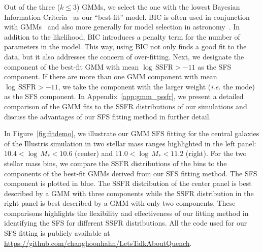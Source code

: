 \documentclass[preprint2,tighten]{aastex62}
\begin{document}
Out of the three ($k{\leq}3$) GMMs, we select the one with the lowest Bayesian 
Information Criteria~\citep[BIC;][]{schwarz1978} as our ``best-fit'' model. 
BIC is often used in conjunction with GMMs~\citep[\emph{e.g.}][]{leroux1992,roeder1997,fraley1998,steele2010performance} 
and also more generally for model selection in 
astronomy~\citep[\emph{e.g.}][]{liddle2007,broderick2011,vakili2016}.
In addition to the likelihood, BIC introduces a penalty term for the number
of parameters in the model. This way, using BIC not only finds a good fit to 
the data, but it also addresses the concern of over-fitting. 
Next, we designate the component of the best-fit GMM with mean 
$\log\,\mathrm{SSFR} > −11$ as the SFS component. If there are more 
than one GMM component with mean $\log\,\mathrm{SSFR} > −11$, 
we take the component with the larger weight (\emph{i.e.} the mode) 
as the SFS component. 
{\color{red} In Appendix~\ref{app:gmm_pssfr}, we present a detailed 
comparison of the GMM fits to the SSFR distributions of our simulations 
and discuss the advantages of our SFS fitting method in further detail.} 


In Figure~\ref{fig:fitdemo}, we illustrate our GMM SFS fitting for the 
central galaxies of the Illustris simulation in two stellar mass 
ranges highlighted in the left panel: $10.4 < \log\,M_* < 10.6$ (center) 
and $11.0 < \log\,M_* < 11.2$ (right). For the two stellar mass bins, 
we compare the SSFR distributions of the bins to the components of the 
best-fit GMMs derived from our SFS fitting method. The SFS component 
is plotted in blue. The SSFR distribution of the center panel is best 
described by a GMM with three components while the SSFR distribution 
in the right  panel is best described by a GMM with only two components.
These comparisons highlights the flexibility and effectiveness 
of our fitting method in identifying the SFS for different SSFR 
distributions. 
All the code used for our SFS fitting is publicly available 
at \url{https://github.com/changhoonhahn/LetsTalkAboutQuench}.
\end{document}
